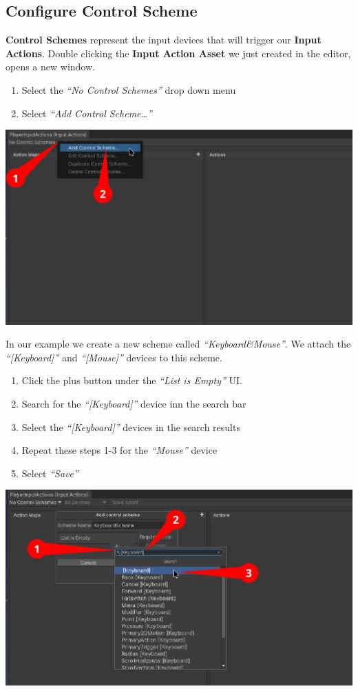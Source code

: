 \documentclass[a4paper,11pt,twoside]{article}
\begin{document}
\subsection*{Configure Control Scheme}
\label{sec:orga90cb95}
\textbf{Control Schemes} represent the input devices that will trigger our \textbf{Input Actions}.
Double clicking the \textbf{Input Action Asset} we just created in the editor, opens a new window.
\begin{enumerate}
\item Select the \emph{``No Control Schemes''} drop down menu
\item Select \emph{``Add Control Scheme\ldots{}''}
\end{enumerate}
\begin{center}
\includegraphics[width=.9\linewidth]{./SnapShots/ControlScheme.png}
\end{center}
In our example we create a new scheme called \emph{``Keyboard\&Mouse''}. We attach the \emph{``[Keyboard]''} and \emph{``[Mouse]''} devices to this scheme.
\begin{enumerate}
\item Click the plus button under the \emph{``List is Empty''} UI.
\item Search for the \emph{``[Keyboard]''} device inn the search bar
\item Select the \emph{``[Keyboard]''} devices in the search results
\item Repeat these steps 1-3 for the \emph{``Mouse''} device
\item Select \emph{``Save''}
\end{enumerate}
\begin{center}
\includegraphics[width=.9\linewidth]{./SnapShots/AddScheme.png}
\end{center}
\end{document}
